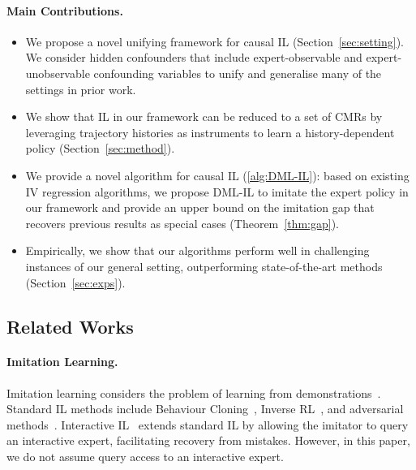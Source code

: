 

\paragraph{Main Contributions.}
\begin{itemize}[leftmargin=10pt, topsep=0pt, itemsep=2pt]
    \item We propose a novel unifying framework for causal IL (Section~\ref{sec:setting}). We consider hidden confounders that include expert-observable and expert-unobservable confounding variables to unify and generalise many of the settings in prior work. 
    \item We show that IL in our framework can be reduced to a set of CMRs by leveraging trajectory histories as instruments to learn a history-dependent policy (Section~\ref{sec:method}).
    \item We provide a novel algorithm for causal IL (\cref{alg:DML-IL}): based on existing IV regression algorithms, we propose DML-IL to imitate the expert policy in our framework and provide an upper bound on the imitation gap that recovers previous results as special cases (Theorem~\ref{thm:gap}).  
    \item Empirically, we show that our algorithms perform well in challenging instances of our general setting, outperforming state-of-the-art methods (Section~\ref{sec:exps}). 
\end{itemize}


\subsection{Related Works}
\paragraph{Imitation Learning.}
Imitation learning considers the problem of learning from demonstrations~\citep{Pomerleau1988,Lecun2005}. Standard IL methods include Behaviour Cloning~\citep{Pomerleau1988}, Inverse RL~\citep{Russell1998}, and adversarial methods~\citep{Ho2016}. Interactive IL~\citep{Ross2011} extends standard IL by allowing the imitator to query an interactive expert, facilitating recovery from mistakes. However, in this paper, we do not assume query access to an interactive expert.


